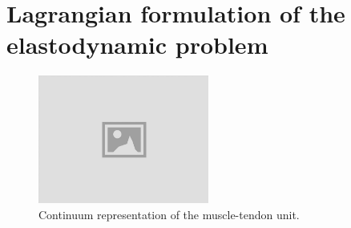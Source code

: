 \documentclass{sfuthesis}
\numberwithin{equation}{section}
\numberwithin{figure}{chapter}
\numberwithin{table}{chapter}
\theoremstyle{definition}
\def\*#1{{\mathbf{#1}}} %
\def\bchi{{\bm{\chi}}}
\begin{document}




\section{Lagrangian formulation of the elastodynamic problem}

\begin{figure}
    \centering
    \includegraphics[width=0.5\textwidth]{placeholder-img.jpg}
    \caption{Continuum representation of the muscle-tendon unit.\label{fig:continuum_mtu}}
\end{figure}
\end{document}
